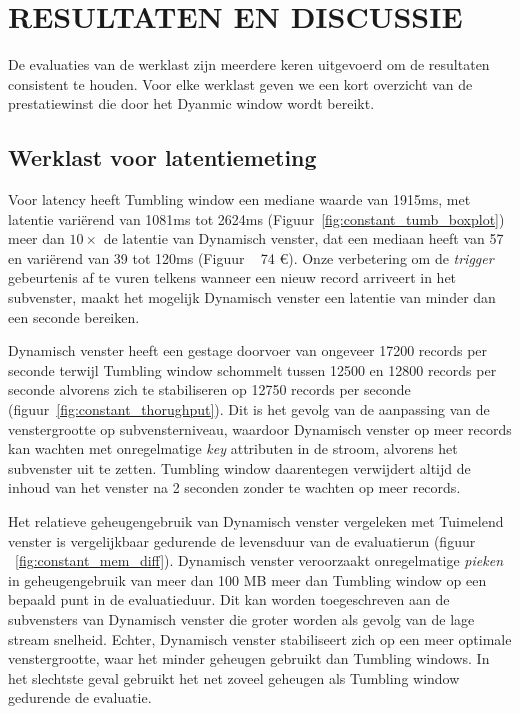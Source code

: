 \section{RESULTATEN EN DISCUSSIE}%
\label{chap:Results and Discussion}

De evaluaties van de werklast zijn meerdere keren uitgevoerd om de resultaten consistent te houden. 
Voor elke werklast geven we een kort overzicht van de prestatiewinst 
die door het Dyanmic window wordt bereikt. 

\subsection{Werklast voor latentiemeting}%
\label{sec:Results Workload for latency measurement}
Voor latency heeft Tumbling window een mediane waarde van 1915ms, 
met latentie variërend van 1081ms tot 2624ms (Figuur~\ref{fig:constant_tumb_boxplot})
meer dan $10\times$ de latentie van Dynamisch venster, dat een mediaan heeft 
van 57 en variërend van 39 tot 120ms (Figuur ~ 74 €). 
Onze verbetering om de \emph{trigger} gebeurtenis af te vuren telkens wanneer een
nieuw record arriveert in het 
subvenster, maakt het mogelijk 
Dynamisch venster een latentie van minder dan een seconde bereiken. 

Dynamisch venster heeft een 
gestage doorvoer van ongeveer 17200 records per seconde terwijl Tumbling window schommelt tussen 
12500 en 12800 records per seconde alvorens zich te stabiliseren op 12750 records per seconde (figuur~\ref{fig:constant_thorughput}). 
Dit is het gevolg van de aanpassing van de venstergrootte op subvensterniveau, waardoor Dynamisch venster op meer records kan wachten 
met onregelmatige \emph{key} attributen in de stroom, alvorens het subvenster uit te zetten. 
Tumbling window daarentegen 
verwijdert altijd de inhoud van het venster na 2 seconden zonder te wachten op meer 
records.

Het relatieve geheugengebruik van Dynamisch venster vergeleken met Tuimelend venster 
is vergelijkbaar gedurende de levensduur van de 
evaluatierun (figuur ~\ref{fig:constant_mem_diff}). 
Dynamisch venster veroorzaakt onregelmatige \emph{pieken} in geheugengebruik van meer dan
100 MB meer dan Tumbling window op een bepaald punt in de evaluatieduur. 
Dit kan worden toegeschreven 
aan de subvensters van Dynamisch venster die groter worden als gevolg van de lage stream 
snelheid. Echter,
Dynamisch venster stabiliseert zich op een meer optimale 
venstergrootte, waar het minder geheugen gebruikt dan Tumbling windows. 
In het slechtste geval gebruikt het net zoveel geheugen als Tumbling window gedurende de evaluatie. 

